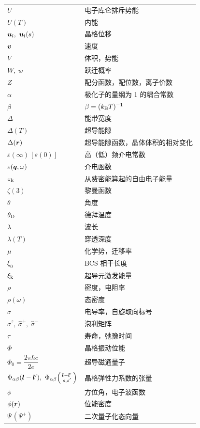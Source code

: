 \par\bigbreak
{\small
\begin{tabular}{@{}p{}@{}p{}@{}}
$U$ & 电子库仑排斥势能 \\
$U(T)$ & 内能 \\
$\ve{u}_l,\ \ve{u}_l(s)$ & 晶格位移 \\
$\bm{v}$ & 速度 \\
$V$ & 体积，势能 \\
$W,\ w$ & 跃迁概率 \\
$Z$ & 配分函数，配位数，离子价数 \\
$\alpha$ & 极化子的量纲为 1 的耦合常数 \\
$\beta$ & $\beta=(k_{\rm B}T)^{-1}$ \\
$\Delta$ & 能带宽度 \\
$\Delta(T)$ & 超导能隙 \\
$\Delta(\bm{r})$ & 超导能隙函数，晶体体积的相对变化 \\
$\varepsilon(\infty)\,[\varepsilon(0)]$ & 高（低）频介电常数 \\
$\varepsilon(\bm{q},\omega)$ & 介电函数 \\
$\varepsilon_{\rm k}$ & 从费密能算起的自由电子能量 \\
$\zeta(3)$ & 黎曼函数 \\
$\theta$ & 角度 \\
$\theta_{\rm D}$ & 德拜温度 \\
$\lambda$ & 波长 \\
$\lambda(T)$ & 穿透深度 \\
$\mu$ & 化学势，迁移率 \\
$\xi_0$ & BCS 相干长度 \\
$\xi_{\rm k}$ & 超导元激发能量 \\
$\rho$ & 密度，电阻率 \\
$\rho(\omega)$ & 态密度 \\
$\sigma$ & 电导率，自旋取向标号 \\
$\hat{\sigma}^{z},\ \hat{\sigma}^{+},\ \hat{\sigma}^{-}$ & 泡利矩阵 \\
$\tau$ & 寿命，弛豫时间 \\
$\Phi$ & 晶格振动位能 \\
$\Phi_0=\dfrac{2\pi\hbar c}{2e}$ & 超导磁通量子 \\
$\Phi_{\alpha\beta}(\ve{l}-\ve{l}'),\ \Phi_{\alpha\beta}\!\left(\begin{smallmatrix}\ve{l}-\ve{l}'\\ s,s'\end{smallmatrix}\right)$ & 晶格弹性力系数的张量 \\
$\phi$ & 方位角，电子波函数 \\
$\phi(\bm{r})$ & 位能密度 \\
$\Psi\,(\Psi^{+})$ & 二次量子化态向量 \\
\end{tabular}
}
